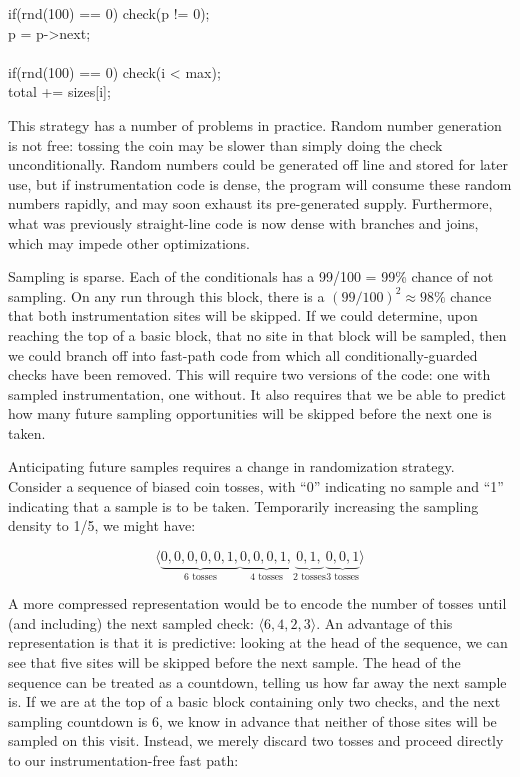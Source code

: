 \begin{code}
  if(rnd(100) == 0) check(p != 0); \\
  \up p = p->next; \\
  \\
  if(rnd(100) == 0) check(i < max); \\
  \up total += sizes[i];
\end{code}

This strategy has a number of problems in practice.  Random number
generation is not free: tossing the coin may be slower than simply
doing the check unconditionally.  Random numbers could be generated
off line and stored for later use, but if instrumentation code is
dense, the program will consume these random numbers rapidly, and may
soon exhaust its pre-generated supply.  Furthermore, what was
previously straight-line code is now dense with branches and joins,
which may impede other optimizations.

Sampling is sparse.  Each of the conditionals has a 99/100 = 99\%
chance of not sampling.  On any run through this block, there is a
$(99/100)^2 \approx 98\%$ chance that both instrumentation sites will
be skipped.  If we could determine, upon reaching the top of a basic
block, that no site in that block will be sampled, then we could
branch off into fast-path code from which all conditionally-guarded
checks have been removed.  This will require two versions of the code:
one with sampled instrumentation, one without.  It also requires that
we be able to predict how many future sampling opportunities will be
skipped before the next one is taken.

Anticipating future samples requires a change in randomization
strategy.  Consider a sequence of biased coin tosses, with ``0''
indicating no sample and ``1'' indicating that a sample is to be
taken.  Temporarily increasing the sampling density to 1/5, we might
have:

\begin{equation*}
  \langle
    \underbrace{0, 0, 0, 0, 0, 1,}_{\text{6 tosses}}
    \underbrace{0, 0, 0, 1,}_{\text{4 tosses}}
    \underbrace{0, 1,}_{\text{2 tosses}}
    \underbrace{0, 0, 1}_{\text{3 tosses}}
    \rangle
\end{equation*}

A more compressed representation would be to encode the number of
tosses until (and including) the next sampled check: $\langle 6, 4, 2,
3 \rangle$.  An advantage of this representation is that it is
predictive: looking at the head of the sequence, we can see that five
sites will be skipped before the next sample.  The head of the
sequence can be treated as a countdown, telling us how far away the
next sample is.  If we are at the top of a basic block containing only
two checks, and the next sampling countdown is 6, we know in advance
that neither of those sites will be sampled on this visit.  Instead,
we merely discard two tosses and proceed directly to our
instrumentation-free fast path:

